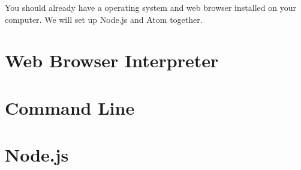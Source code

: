 You should already have a operating system and web browser installed on your computer. We will set up Node.js and Atom together.

\section{Web Browser Interpreter}

\section{Command Line}

\section{Node.js}
